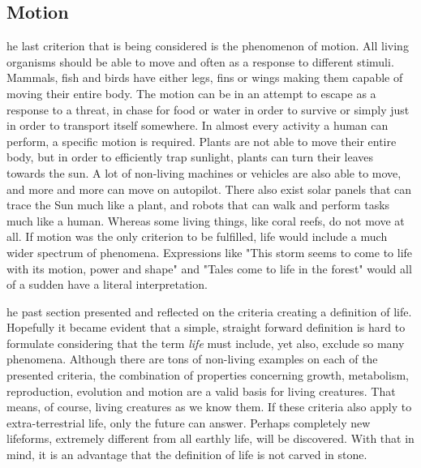 \subsection{Motion}
he last criterion that is being considered is the phenomenon of motion.
All living organisms should be able to move and often as a response to different stimuli.
Mammals, fish and birds have either legs, fins or wings making them capable of moving their entire body.
The motion can be in an attempt to escape as a response to a threat, in chase for food or water in order to survive or simply just in order to transport itself somewhere.
In almost every activity a human can perform, a specific motion is required.
Plants are not able to move their entire body, but in order to efficiently trap sunlight, plants can turn their leaves towards the sun.
A lot of non-living machines or vehicles are also able to move, and more and more can move on autopilot.
There also exist solar panels that can trace the Sun much like a plant, and robots that can walk and perform tasks much like a human.
Whereas some living things, like coral reefs, do not move at all.
If motion was the only criterion to be fulfilled, life would include a much wider spectrum of phenomena.
Expressions like "This storm seems to come to life with its motion, power and shape" and "Tales come to life in the forest" would all of a sudden have a literal interpretation. 


he past section presented and reflected on the criteria creating a definition of life.
Hopefully it became evident that a simple, straight forward definition is hard to formulate considering that the term \textit{life} must include, yet also, exclude so many phenomena.
Although there are tons of non-living examples on each of the presented criteria, the combination of properties concerning growth, metabolism, reproduction, evolution and motion are a valid basis for living creatures.
That means, of course, living creatures as we know them.
If these criteria also apply to extra-terrestrial life, only the future can answer.
Perhaps completely new lifeforms, extremely different from all earthly life, will be discovered.
With that in mind, it is an advantage that the definition of life is not carved in stone.